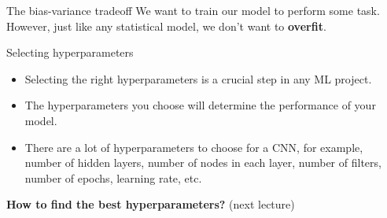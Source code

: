 \documentclass[9pt, aspectratio=169]{beamer}
\begin{document}
\begin{frame}
    {The bias-variance tradeoff}
    We want to train our model to perform some task. However, just like any statistical model, we don't want to \textbf{overfit}.

\end{frame}

\begin{frame}
    {Selecting hyperparameters}
    \begin{itemize}
        \item Selecting the right hyperparameters is a crucial step in any ML project.
        \item The hyperparameters you choose will determine the performance of your model.
        \item There are a lot of hyperparameters to choose for a CNN, for example, number of hidden layers, number of nodes in each layer, number of filters, number of epochs, learning rate, etc.
    \end{itemize}

    \centering
    \textbf{How to find the best hyperparameters?} (next lecture)
\end{frame}
\end{document}
